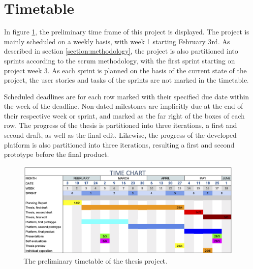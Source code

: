 \section{Timetable}
\label{section:timetable}
In figure \ref{fig:timetable}, the preliminary time frame of this project is displayed. The project is mainly scheduled on a weekly basis, with week 1 starting February 3rd. As described in section \ref{section:methodology}, the project is also partitioned into sprints according to the scrum methodology, with the first sprint starting on project week 3. As each sprint is planned on the basis of the current state of the project, the user stories and tasks of the sprints are not marked in the timetable.

Scheduled deadlines are for each row marked with their specified due date within the week of the deadline. Non-dated milestones are implicitly due at the end of their respective week or sprint, and marked as the far right of the boxes of each row. The progress of the thesis is partitioned into three iterations, a first and second draft, as well as the final edit. Likewise, the progress of the developed platform is also partitioned into three iterations, resulting a first and second prototype before the final product. 

\begin{figure}[H]
    \centering
    \includegraphics[width = \textwidth]{Planning report/images/timetable.png}
    \caption{The preliminary timetable of the thesis project.}
    \label{fig:timetable}
\end{figure}